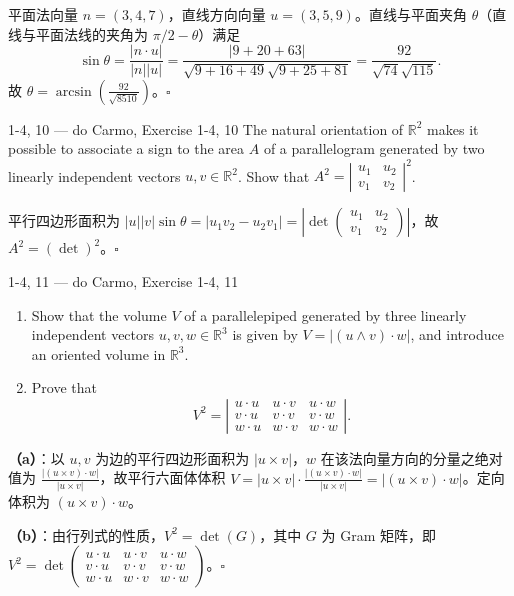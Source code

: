 \begin{solution}
平面法向量 $n = (3,4,7)$，直线方向向量 $u = (3,5,9)$。直线与平面夹角 $\theta$（直线与平面法线的夹角为 $\pi/2-\theta$）满足
\[
\sin\theta = \frac{|n \cdot u|}{|n||u|} = \frac{|9+20+63|}{\sqrt{9+16+49}\sqrt{9+25+81}} = \frac{92}{\sqrt{74}\sqrt{115}}.
\]
故 $\theta = \arcsin\left(\frac{92}{\sqrt{8510}}\right)$。$\square$
\end{solution}

\begin{exercise}{1-4, 10 — do Carmo, Exercise 1-4, 10}
The natural orientation of $\mathbb{R}^2$ makes it possible to associate a sign to the area $A$ of a parallelogram generated by two linearly independent vectors $u, v \in \mathbb{R}^2$. Show that $A^2 = \left| \begin{smallmatrix} u_1 & u_2 \\ v_1 & v_2 \end{smallmatrix} \right|^2$.
\end{exercise}

\begin{solution}
平行四边形面积为 $|u||v|\sin\theta = |u_1v_2-u_2v_1| = \left|\det\begin{pmatrix}u_1&u_2\\v_1&v_2\end{pmatrix}\right|$，故 $A^2 = (\det)^2$。$\square$
\end{solution}

\begin{exercise}{1-4, 11 — do Carmo, Exercise 1-4, 11}
\begin{enumerate}
\item[a.] Show that the volume $V$ of a parallelepiped generated by three linearly independent vectors $u, v, w \in \mathbb{R}^3$ is given by $V = |(u \wedge v) \cdot w|$, and introduce an oriented volume in $\mathbb{R}^3$.
\item[b.] Prove that
\[
V^2 = \left| \begin{array}{ccc}
u \cdot u & u \cdot v & u \cdot w \\
v \cdot u & v \cdot v & v \cdot w \\
w \cdot u & w \cdot v & w \cdot w
\end{array} \right|.
\]
\end{enumerate}
\end{exercise}

\begin{solution}
\textbf{（a）}：以 $u,v$ 为边的平行四边形面积为 $|u\times v|$，$w$ 在该法向量方向的分量之绝对值为 $\frac{|(u\times v)\cdot w|}{|u\times v|}$，故平行六面体体积 $V = |u\times v| \cdot \frac{|(u\times v)\cdot w|}{|u\times v|} = |(u\times v)\cdot w|$。定向体积为 $(u\times v)\cdot w$。

\textbf{（b）}：由行列式的性质，$V^2 = \det(G)$，其中 $G$ 为 Gram 矩阵，即 $V^2 = \det\begin{pmatrix}u\cdot u&u\cdot v&u\cdot w\\ v\cdot u&v\cdot v&v\cdot w\\ w\cdot u&w\cdot v&w\cdot w\end{pmatrix}$。$\square$
\end{solution}

